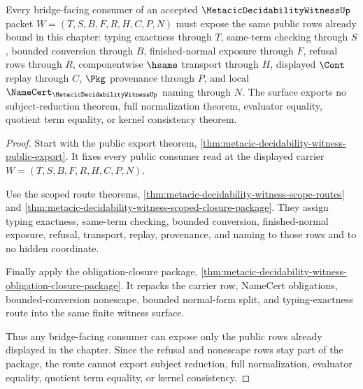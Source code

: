 \begin{theorem}
\label{thm:metacic-decidability-witness-bridge-facing-surface}
Every bridge-facing consumer of an accepted $\MetacicDecidabilityWitnessUp$ packet $W=(T,S,B,F,R,H,C,P,N)$ must expose the same public rows already bound in this chapter: typing exactness through $T$, same-term checking through $S$, bounded conversion through $B$, finished-normal exposure through $F$, refusal rows through $R$, componentwise $\hsame$ transport through $H$, displayed $\Cont$ replay through $C$, $\Pkg$ provenance through $P$, and local $\NameCert_{\MetacicDecidabilityWitnessUp}$ naming through $N$. The surface exports no subject-reduction theorem, full normalization theorem, evaluator equality, quotient term equality, or kernel consistency theorem.
\end{theorem}
\begin{proof}
Start with the public export theorem, \autoref{thm:metacic-decidability-witness-public-export}. It fixes every public consumer read at the displayed carrier $W=(T,S,B,F,R,H,C,P,N)$.

Use the scoped route theorems, \autoref{thm:metacic-decidability-witness-scope-routes} and \autoref{thm:metacic-decidability-witness-scoped-closure-package}. They assign typing exactness, same-term checking, bounded conversion, finished-normal exposure, refusal, transport, replay, provenance, and naming to those rows and to no hidden coordinate.

Finally apply the obligation-closure package, \autoref{thm:metacic-decidability-witness-obligation-closure-package}. It repacks the carrier row, NameCert obligations, bounded-conversion nonescape, bounded normal-form split, and typing-exactness route into the same finite witness surface.

Thus any bridge-facing consumer can expose only the public rows already displayed in the chapter. Since the refusal and nonescape rows stay part of the package, the route cannot export subject reduction, full normalization, evaluator equality, quotient term equality, or kernel consistency.
\end{proof}


